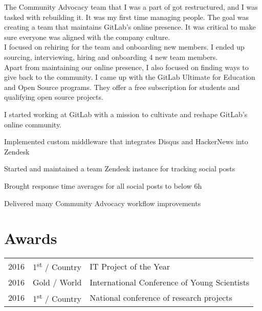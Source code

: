 \documentclass[]{matija-resume}
\begin{document}
\begin{minipage}[t]{1.0\textwidth}
\vspace{\topsep}
The Community Advocacy team that I was a part of got restructured, and I was tasked with rebuilding it. It was my first time managing people. The goal was creating a team that maintains GitLab's online presence. It was critical to make sure everyone was aligned with the company culture.\\
\vspace{\topsep}
I focused on rehiring for the team and onboarding new members.  I ended up sourcing, interviewing, hiring and onboarding 4 new team members.\\
\vspace{\topsep}
Apart from maintaining our online presence, I also focused on finding ways to give back to the community. I came up with the GitLab Ultimate for Education and Open Source programs. They offer a free subscription for students and qualifying open source projects.
\sectionsep

\vspace{\topsep}
I started working at GitLab with a mission to cultivate and reshape GitLab's online community.
\vspace{\topsep}
\begin{tightemize}
\item Implemented custom middleware that integrates Disqus and HackerNews into Zendesk
\item Started and maintained a team Zendesk instance for tracking social posts
\item Brought response time averages for all social posts to below 6h
\item Delivered many Community Advocacy workflow improvements
\end{tightemize}
\sectionsep

\end{minipage}

\begin{minipage}[t]{1.0\textwidth}

\section{Awards}
\begin{tabular}{rll}
2016 & 1\textsuperscript{st} / Country & IT Project of the Year\\
2016 & Gold / World & International Conference of Young Scientists\\
2016 & 1\textsuperscript{st} / Country & National conference of research projects
\end{tabular}
\sectionsep
\end{minipage}
\end{document}
